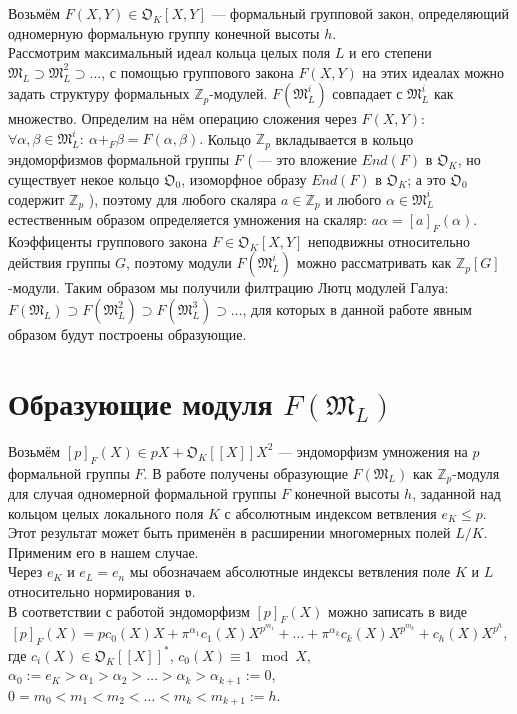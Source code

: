\documentclass[a4paper]{article}
\newcommand{\Zp}{\mathbb{Z}_p}
\newcommand{\ML}{\mathfrak{M}_L}
\newcommand{\OK}{\mathfrak{O}_K}
\newcommand{\val}{\mathfrak{v}}
\newcommand{\Leq}{\leqslant}
\begin{document}
Возьмём $F(X,Y)\in\OK[X,Y]$ --- формальный групповой закон, определяющий одномерную формальную группу конечной высоты $h$.\\ 
Рассмотрим максимальный идеал кольца целых поля $L$ и его степени $\ML\supset\ML^2\supset\dots$, с помощью группового закона $F(X,Y)$ на этих идеалах можно задать структуру формальных $\Zp$-модулей. $F(\ML^i)$ совпадает с $\ML^i$ как множество. Определим на нём операцию сложения через $F(X,Y)$: $\forall\alpha,\beta\in\ML^i:\ \alpha+_F\beta=F(\alpha,\beta).$ Кольцо $\Zp$ вкладывается в кольцо эндоморфизмов формальной группы $F$ (\cite[\S 2]{book6} --- это вложение $End(F)$ в $\OK$, но существует некое кольцо $\mathfrak{O}_0$, изоморфное образу $End(F)$ в $\OK$; а это $\mathfrak{O}_0$ содержит $\Zp$ \cite[\S2.3]{book6}), поэтому для любого скаляра $a\in\Zp$ и любого $\alpha\in\ML^i$ естественным образом определяется умножения на скаляр: $a\alpha=[a]_F(\alpha)$.\\
Коэффиценты группового закона $F \in \OK[X,Y]$ неподвижны относительно действия группы $G$, поэтому модули $F(\ML^i)$ можно рассматривать как $\Zp[G]$-модули. Таким образом мы получили филтрацию Лютц модулей Галуа: $F(\ML) \supset F(\ML^2) \supset F(\ML^3) \supset \ldots$, для которых в данной работе явным образом будут построены образующие.

\section{Образующие модуля $F(\ML)$}

Возьмём $[p]_F(X) \in pX+\OK[[X]]X^2$ --- эндоморфизм умножения на $p$ формальной группы $F$. В работе \cite[Арифметика формального модуля]{book2} получены образующие $F(\ML)$ как $\Zp$-модуля для случая одномерной формальной группы $F$ конечной высоты $h$, заданной над кольцом целых локального поля $K$ с абсолютным индексом ветвления $e_K \Leq p$. Этот результат может быть применён в расширении многомерных полей $L/K$. Применим его в нашем случае.\\

Через $e_K$ и $e_L = e_n$ мы обозначаем абсолютные индексы ветвления поле $K$ и $L$ относительно нормирования $\val$. \\
В соответствии с работой \cite{book2} эндоморфизм $[p]_F(X)$ можно записать в виде
$$[p]_F(X)=pc_0(X)X+\pi^{\alpha_1}c_1(X)X^{p^{m_1}}+\dots+\pi^{\alpha_k}c_k(X)X^{p^{m_k}}+c_h(X)X^{p^h},$$
где $c_i(X) \in \OK[[X]]^*$, $c_0(X) \equiv 1 \mod X$, $\alpha_0:=e_K>\alpha_1>\alpha_2>\dots>\alpha_k>\alpha_{k+1}:=0$, $0=m_0<m_1<m_2<\dots<m_k<m_{k+1}:=h$.
\end{document}
